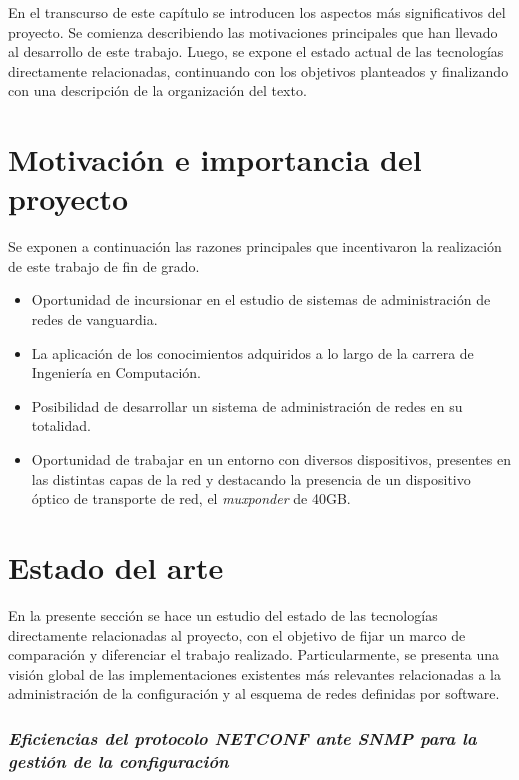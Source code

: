 En el transcurso de este capítulo se introducen los aspectos más significativos del proyecto. Se comienza describiendo las motivaciones principales que han llevado al desarrollo de este trabajo. Luego, se expone el estado actual de las tecnologías directamente relacionadas, continuando con los objetivos planteados y finalizando con una descripción de la organización del texto.

\section{Motivación e importancia del proyecto}

Se exponen a continuación las razones principales que incentivaron la realización de este trabajo de fin de grado.

\begin{itemize}     
    \item Oportunidad de incursionar en el estudio de sistemas de administración de redes de vanguardia.
    \item La aplicación de los conocimientos adquiridos a lo largo de la carrera de Ingeniería en Computación.
    \item Posibilidad de desarrollar un sistema de administración de redes en su totalidad.
    \item Oportunidad de trabajar en un entorno con diversos dispositivos, presentes en las distintas capas de la red y destacando la presencia de un dispositivo óptico de transporte de red, el \textit{muxponder} de 40GB.
\end{itemize}
    
\section{Estado del arte} \label{Estado_Arte} %

En la presente sección se hace un estudio del estado de las tecnologías directamente relacionadas al proyecto, con el objetivo de fijar un marco de comparación y diferenciar el trabajo realizado. Particularmente, se presenta una visión global de las implementaciones existentes más relevantes relacionadas a la administración de la configuración y al esquema de redes definidas por software.



\subsubsection*{\textit{Eficiencias del protocolo NETCONF ante SNMP para la gestión de la configuración}}

